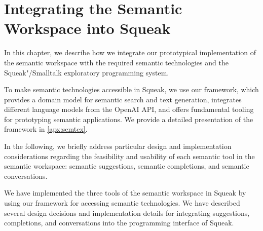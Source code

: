 
\chapter{Integrating the Semantic Workspace into Squeak}
\label{cha:implementation}

In this chapter, we describe how we integrate our prototypical implementation of the semantic workspace with the required semantic technologies and the Squeak"/Smalltalk exploratory programming system.

To make semantic technologies accessible in Squeak, we use our \semtex framework, which provides a domain model for semantic search and text generation, integrates different language models from the OpenAI API, and offers fundamental tooling for prototyping semantic applications.
We provide a detailed presentation of the framework in \cref{apx:semtex}.

In the following, we briefly address particular design and implementation considerations regarding the feasibility and usability of each semantic tool in the semantic workspace: semantic suggestions, semantic completions, and semantic conversations.


\begin{summary}
	We have implemented the three tools of the semantic workspace in Squeak by using our \semtex framework for accessing semantic technologies.
	We have described several design decisions and implementation details for integrating suggestions, completions, and conversations into the programming interface of Squeak.
\end{summary}
